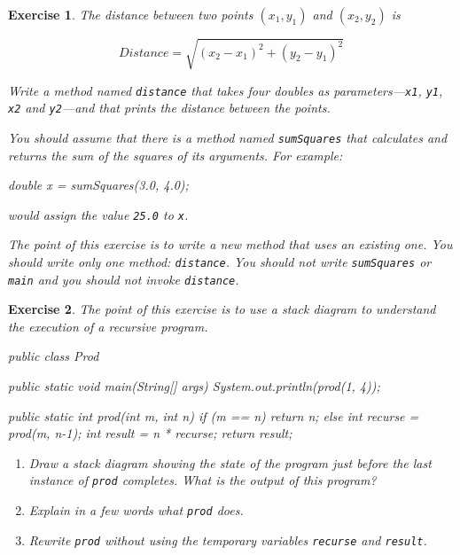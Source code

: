 \documentclass[12pt]{book}
\theoremstyle{exercise}
\newtheorem{exercise}{Exercise}[chapter]
\begin{document}
\begin{exercise}
The distance between two points $(x_1, y_1)$ and $(x_2, y_2)$ is

\[ Distance = \sqrt{(x_2 - x_1)^2 +(y_2 - y_1)^2} \]

Write a method named {\tt distance} that takes four doubles as parameters---{\tt x1}, {\tt y1}, {\tt x2} and {\tt y2}---and that prints the distance between the points.

You should assume that there is a method named {\tt sumSquares} that calculates and returns the sum of the squares of its arguments.
For example:

\begin{code}
    double x = sumSquares(3.0, 4.0);
\end{code}

would assign the value {\tt 25.0} to {\tt x}.

The point of this exercise is to write a new method that uses an existing one.
You should write only one method: {\tt distance}.
You should not write {\tt sumSquares} or {\tt main} and you should not invoke {\tt distance}.
\end{exercise}

\begin{exercise}
The point of this exercise is to use a stack diagram to understand the execution of a recursive program.

\begin{code}
public class Prod {

    public static void main(String[] args) {
        System.out.println(prod(1, 4));
    }

    public static int prod(int m, int n) {
        if (m == n) {
            return n;
        } else {
            int recurse = prod(m, n-1);
            int result = n * recurse;
            return result;
        }
    }
}
\end{code}

\begin{enumerate}

\item Draw a stack diagram showing the state of the program just before the last instance of {\tt prod} completes.
What is the output of this program?

\item Explain in a few words what {\tt prod} does.

\item Rewrite {\tt prod} without using the temporary variables {\tt recurse} and {\tt result}.

\end{enumerate}
\end{exercise}
\end{document}
